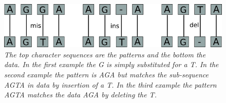 \documentclass[12pt]{article}
\begin{document}
\begin{figure}[H]
\begin{center}
\includegraphics[scale=0.6]{Diagrams/midex.png}
\end{center}
\caption{\textit{The top character sequences are the patterns and the bottom the data. In the first example the G is simply
substituted for a T. In the second example the pattern is AGA but matches the sub-sequence AGTA in data by insertion of a
T. In the third example the pattern AGTA matches the data AGA by deleting the T.}}
\end{figure}
%
%
%
%
%
%
\end{document}
